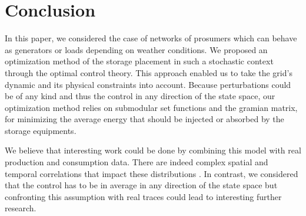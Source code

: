 \documentclass[conference]{IEEEtran}
\begin{document}
\section{Conclusion}
\label{sec:Conclusion}
In this paper, we considered the case of networks of prosumers which can behave as generators or loads depending on weather conditions. We proposed an optimization method of the storage placement in such a stochastic context through the optimal control theory. This approach enabled us to take the grid's dynamic and its physical constraints into account. Because perturbations could be of any kind and thus the control in any direction of the state space, our optimization method relies on submodular set functions and the gramian matrix, for minimizing the average energy that should be injected or absorbed by the storage equipments.

We believe that interesting work could be done by combining this model with real production and consumption data. There are indeed complex spatial and temporal correlations that impact these distributions \cite{Gensollen2014}. In contrast, we considered that the control has to be in average in any direction of the state space but confronting this assumption with real traces could lead to interesting further research.



  

\end{document}
